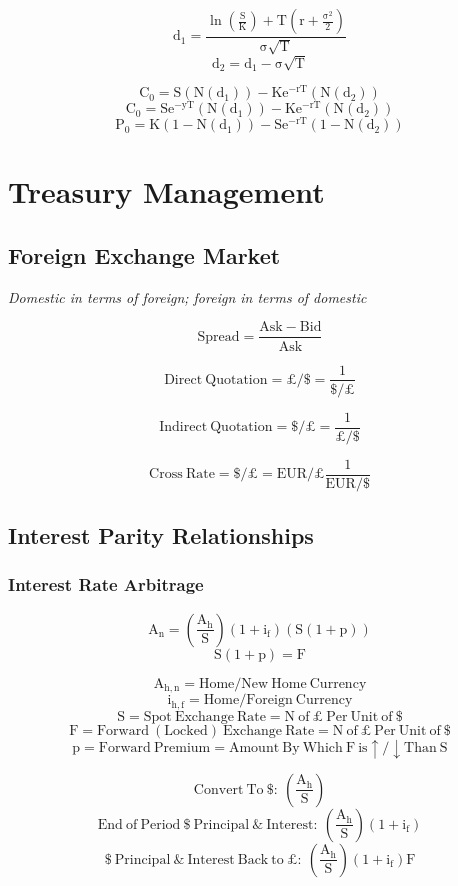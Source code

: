 \documentclass[11pt, english]{article}
\begin{document}
	$$\mathrm{d_1=\frac{\ln\left(\frac{S}{K}\right)+T\left(r+\frac{\sigma^2}{2}\right)}{\sigma\sqrt{T}}}$$
	$$\mathrm{d_2=d_1-\sigma\sqrt{T}}$$

	$$\mathrm{C_0=S(N(d_1))-Ke^{-rT}(N(d_2))}$$
	$$\mathrm{C_0=Se^{-yT}(N(d_1))-Ke^{-rT}(N(d_2))}$$
	$$\mathrm{P_0=K(1-N(d_1))-Se^{-rT}(1-N(d_2))}$$

\newpage

\section{Treasury Management}

	\subsection{Foreign Exchange Market}

	\textit{Domestic in terms of foreign; foreign in terms of domestic}

	$$\mathrm{Spread=\frac{Ask-Bid}{Ask}}$$

	$$\mathrm{Direct\ Quotation=\pounds/\$=\frac{1}{\$/\pounds}}$$

	$$\mathrm{Indirect\ Quotation=\$/\pounds=\frac{1}{\pounds/\$}}$$

	$$\mathrm{Cross\ Rate=\$/\pounds=EUR/\pounds\frac{1}{EUR/\$}}$$

	\subsection{Interest Parity Relationships}

		\subsubsection{Interest Rate Arbitrage}

	$$\mathrm{A_n=\left(\frac{A_h}{S}\right)(1+i_f)(S(1+p))}$$
	$$\mathrm{S(1+p)=F}$$

	$$\mathrm{A_{h,n}=Home/New\ Home\ Currency}$$
	$$\mathrm{i_{h,f}=Home/Foreign\ Currency}$$
	$$\mathrm{S=Spot\ Exchange\ Rate=N\ of\ \pounds\ Per\ Unit\ of\ \$}$$
	$$\mathrm{F=Forward\ (Locked)\ Exchange\ Rate=N\ of\ \pounds\ Per\ Unit\ of\ \$}$$
	$$\mathrm{p=Forward\ Premium=Amount\ By\ Which\ F\ is \uparrow/\downarrow Than\ S}$$

	$$\mathrm{Convert\ To\ \$:\ \left(\frac{A_h}{S}\right)}$$
	$$\mathrm{End\ of\ Period\ \$\ Principal\ \&\ Interest:\ \left(\frac{A_h}{S}\right)(1+i_f)}$$
	$$\mathrm{\$\ Principal\ \&\ Interest\ Back\ to\ \pounds:\ \left(\frac{A_h}{S}\right)(1+i_f)F}$$
\end{document}
